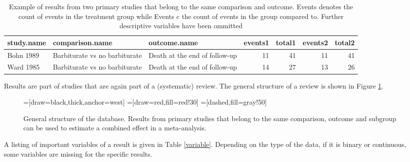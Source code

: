 \documentclass[11pt,a4paper,twoside]{book}\usepackage[]{graphicx}\usepackage[]{color}
\begin{document}
\begin{table}[ht]
\centering
\begingroup\scriptsize
\begin{tabular}{lllrrrr}
  \hline
study.name & comparison.name & outcome.name & events1 & total1 & events2 & total2 \\ 
  \hline
Bohn 1989 & Barbiturate vs no barbiturate & Death at the end of follow-up & 11 & 41 & 11 & 41 \\ 
  Ward 1985 & Barbiturate vs no barbiturate & Death at the end of follow-up & 14 & 27 & 13 & 26 \\ 
   \hline
\end{tabular}
\endgroup
\caption{Example of results from two primary studies that belong to the same comparison and outcome. Events denotes the count of events in the treatment group while Events c the count of events in the group compared to. Further descriptive variables have been ommitted} 
\label{barbiturate.row}
\end{table}



Results are part of studies that are again part of a (systematic) review. The general structure of a review is shown in Figure \ref{review.structure}.

\begin{figure}
=[draw=black,thick,anchor=west]
=[draw=red,fill=red!30]
=[dashed,fill=gray!50]
\caption{General structure of the database. Results from primary studies that belong to the same comparison, outcome and subgroup can be used to estimate a combined effect in a meta-analysis.}
\label{review.structure}
\end{figure}

A listing of important variables of a result is given in Table \ref{variable}. Depending on the type of the data, \eg if it is binary or continuous, some variables are missing for the specific results.
\end{document}
